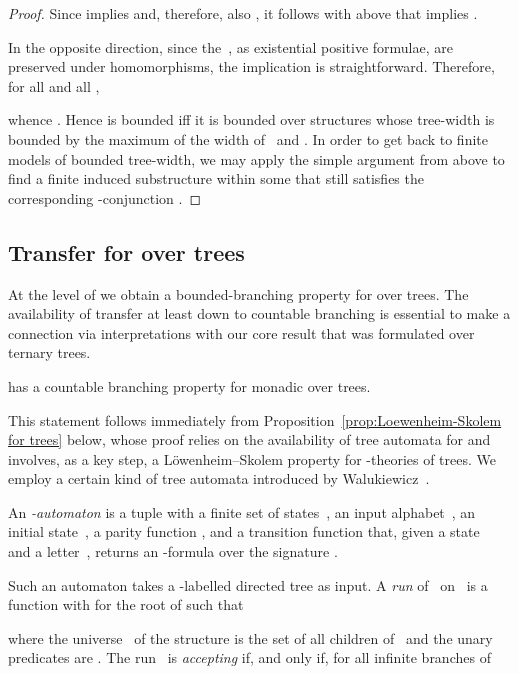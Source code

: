 \documentclass{LMCS}
\begin{document}
\begin{thm}
\begin{proof}
Since  implies 
and, therefore, also ,
it follows with  above that 
 implies 
.

In the opposite direction,
since the~, as existential positive
formulae, are preserved under homomorphisms,
the implication
 is straightforward.
Therefore, for all  and all ,

whence .
Hence  is bounded iff it is bounded over structures
whose tree-width is bounded by the
maximum of the width of~ and .
In order to get back to finite models
of bounded tree-width, we may apply the simple
argument from above to find a finite induced substructure within
some  that still satisfies the corresponding
-conjunction
.
\end{proof}


\subsection{\boldmath Transfer for  over trees}

At the level of  we obtain a bounded-branching property
for  over trees. The availability of transfer at least
down to countable branching is essential to make a connection
via interpretations with our core result that was formulated over
ternary trees.

\begin{prop}\label{prop:countable branching property for MSO}
 has a countable branching property for monadic  over trees.
\end{prop}

This statement follows immediately from
Proposition~\ref{prop:Loewenheim-Skolem for trees} below,
whose proof relies on
the availability of tree automata for  and involves, as a key step,
a L\"owenheim--Skolem property for -theories of trees.
We employ a certain kind
of tree automata introduced by Walukiewicz~\cite{Walukiewicz02}.
\begin{defi}
An \emph{-automaton} is a tuple 
with a finite set of states~, an input alphabet~,
an initial state~, a parity function ,
and a transition function 
that, given a state~ and a letter~, returns an -formula
 over the signature .

Such an automaton takes a -labelled directed tree
 as input.
A \emph{run} of~ on~ is a function 
with  for the root  of 
such that

where the universe~ of the structure is the set of all children of~
and the unary predicates are .
The run~ is \emph{accepting}
if, and only if, for all infinite branches  of~


\end{defi}
\end{thm}
\end{document}
